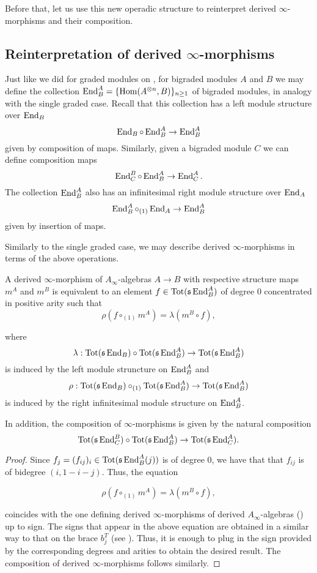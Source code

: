 \documentclass[join.tex]{subfiles}
\begin{document}
Before that, let us use this new operadic structure to reinterpret derived $\infty
$-morphisms and their composition.
\subsection{Reinterpretation of derived $\infty$-morphisms}

Just like we did for graded modules on , for bigraded modules $A$ and $B$ we may define the collection $\operatorname{End}^A_B=\{\operatorname{Hom}(A^{\otimes n}, B)\}_{n\geq 1}$ of bigraded modules,  in analogy with the single graded case. Recall that this collection has a left module structure over $\operatorname{End}_B$
\[\operatorname{End}_B\circ \operatorname{End}^A_B\to \operatorname{End}^A_B\]
given by composition of maps. Similarly, given a bigraded module $C$ we can define composition maps
\[\operatorname{End}^B_C\circ \operatorname{End}^A_B\to \operatorname{End}^A_C.\]
The collection $\operatorname{End}^A_B$ also has an infinitesimal right module structure over $\operatorname{End}_A$
\[\operatorname{End}^A_B\circ_{(1)}\operatorname{End}_A\to \operatorname{End}^A_B\]
given by insertion of maps.

Similarly to the single graded case, we may describe derived $\infty$-morphisms in terms of the above operations.

\begin{lem}\label{dinfinitymorphism}
A derived $\infty$-morphism of $A_\infty$-algebras $A\to B$ with respective structure maps $m^A$ and $m^B$ is equivalent to an element $f\in\mathrm{Tot}(\mathfrak{s}\operatorname{End}^A_B)$ of degree 0 concentrated in positive arity such that \[\rho(f\circ_{(1)}m^A)=\lambda(m^B\circ f),\] 

where \[\lambda:\mathrm{Tot}(\mathfrak{s}\operatorname{End}_B)\circ \mathrm{Tot}(\mathfrak{s}\operatorname{End}^A_B)\to \mathrm{Tot}(\mathfrak{s}\operatorname{End}^A_B)\] is induced by the left module struncture on $\operatorname{End}^A_B$ and \[\rho:\mathrm{Tot}(\mathfrak{s}\operatorname{End}_B)\circ_{(1)}\mathrm{Tot}(\mathfrak{s}\operatorname{End}^A_B)\to \mathrm{Tot}(\mathfrak{s}\operatorname{End}^A_B)\] is induced by the right infinitesimal module structure on $\operatorname{End}^A_B$. 

In addition, the composition of $\infty$-morphisms is given by the natural composition \[\mathrm{Tot}(\mathfrak{s}\operatorname{End}^B_C)\circ \mathrm{Tot}(\mathfrak{s}\operatorname{End}^A_B)\to \mathrm{Tot}(\mathfrak{s}\operatorname{End}^A_C).\]
\end{lem}
\begin{proof}
Since $f_j=(f_{ij})_i\in\mathrm{Tot}(\mathfrak{s}\operatorname{End}^A_B(j))$ is of degree $0$, we have that that $f_{ij}$ is of bidegree $(i,1-i-j)$. Thus, the equation

\[\rho(f\circ_{(1)}m^A)=\lambda(m^B\circ f),\] 

coincides with the one defining derived $\infty$-morphisms of derived $A_\infty$-algebras () up to sign. The signs that appear in the above equation are obtained in a similar way to that on the brace $b_j^T$ (see ). Thus, it is enough to plug in the sign provided by  the corresponding degrees and arities to obtain the desired result. The composition of derived $\infty$-morphisms follows similarly.
\end{proof}
\end{document}
